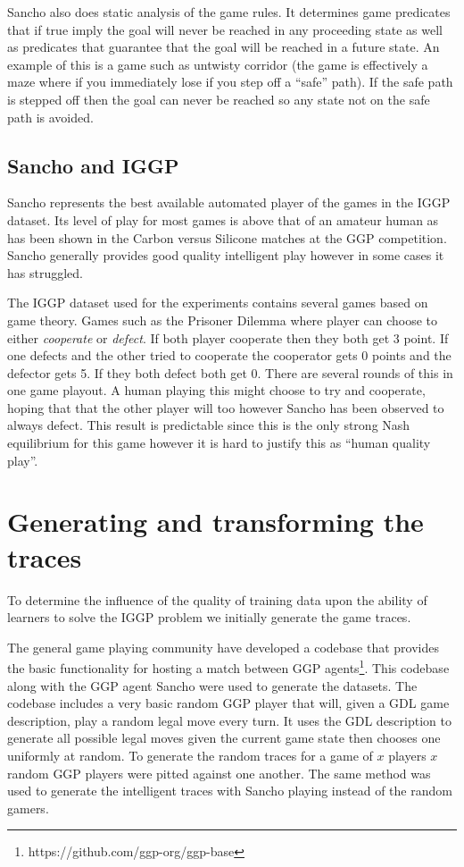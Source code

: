 Sancho also does static analysis of the game rules. It determines game predicates that if true imply the goal will never be reached in any proceeding state as well as predicates that guarantee that the goal will be reached in a future state. An example of this is a game such as untwisty corridor (the game is effectively a maze where if you immediately lose if you step off a ``safe'' path). If the safe path is stepped off then the goal can never be reached so any state not on the safe path is avoided.

\subsection{Sancho and IGGP}
Sancho represents the best available automated player of the games in the IGGP dataset. Its level of play for most games is above that of an amateur human as has been shown in the Carbon versus Silicone matches at the GGP competition\cite{Genesereth/GGPOverview}. Sancho generally provides good quality intelligent play however in some cases it has struggled.

The IGGP dataset used for the experiments contains several games based on game theory. Games such as the Prisoner Dilemma where player can choose to either \textit{cooperate} or \textit{defect}. If both player cooperate then they both get 3 point. If one defects and the other tried to cooperate the cooperator gets 0 points and the defector gets 5. If they both defect both get 0. There are several rounds of this in one game playout. A human playing this might choose to try and cooperate, hoping that that the other player will too however Sancho has been observed to always defect. This result is predictable since this is the only strong Nash equilibrium for this game however it is hard to justify this as ``human quality play''.


\section{Generating and transforming the traces}
To determine the influence of the quality of training data upon the ability of learners to solve the IGGP problem we initially generate the game traces.

The general game playing community have developed a codebase that provides the basic functionality for hosting a match between GGP agents\footnote{https://github.com/ggp-org/ggp-base}. This codebase along with the GGP agent Sancho were used to generate the datasets. The codebase includes a very basic random GGP player that will, given a GDL game description, play a random legal move every turn. It uses the GDL description to generate all possible legal moves given the current game state then chooses one uniformly at random. To generate the random traces for a game of $x$ players $x$ random GGP players were pitted against one another. The same method was used to generate the intelligent traces with Sancho playing instead of the random gamers.

